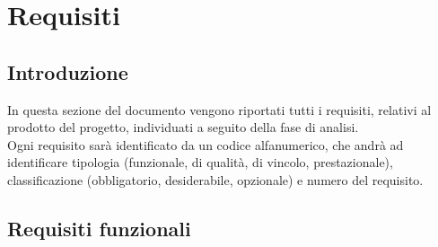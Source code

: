 \chapter{Requisiti}\label{sec:requisiti}
\section{Introduzione}
In questa sezione del documento vengono riportati tutti i requisiti, relativi al prodotto del progetto, individuati a seguito della fase di analisi.\\
Ogni requisito sarà identificato da un codice alfanumerico, che andrà ad identificare tipologia (funzionale, di qualità, di vincolo, prestazionale), classificazione (obbligatorio, desiderabile, opzionale) e numero del requisito.

\section{Requisiti funzionali}

